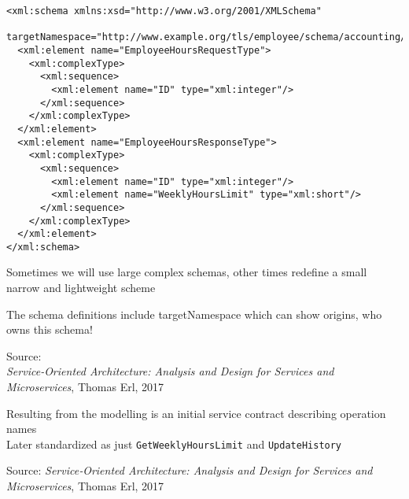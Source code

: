 \documentclass[Screen16to9,17pt]{foils}
\begin{document}

\begin{verbatim}
<xml:schema xmlns:xsd="http://www.w3.org/2001/XMLSchema"
  targetNamespace="http://www.example.org/tls/employee/schema/accounting/">
  <xml:element name="EmployeeHoursRequestType">
    <xml:complexType>
      <xml:sequence>
        <xml:element name="ID" type="xml:integer"/>
      </xml:sequence>
    </xml:complexType>
  </xml:element>
  <xml:element name="EmployeeHoursResponseType">
    <xml:complexType>
      <xml:sequence>
        <xml:element name="ID" type="xml:integer"/>
        <xml:element name="WeeklyHoursLimit" type="xml:short"/>
      </xml:sequence>
    </xml:complexType>
  </xml:element>
</xml:schema>
\end{verbatim}

\begin{list2}

\item Sometimes we will use large complex schemas, other times redefine a small narrow and lightweight scheme
\end{list2}




\begin{list2}
\item The schema definitions include targetNamespace which can show origins, who owns this schema!
\end{list2}
Source: {\footnotesize\\
\emph{Service‑Oriented Architecture: Analysis and Design for Services and Microservices}, Thomas Erl, 2017}







\begin{list2}
\item Resulting from the modelling is an initial service contract describing operation names\\
Later standardized as just \verb+GetWeeklyHoursLimit+ and \verb+UpdateHistory+
\end{list2}
Source: {\footnotesize
\emph{Service‑Oriented Architecture: Analysis and Design for Services and Microservices}, Thomas Erl, 2017}
\end{document}
